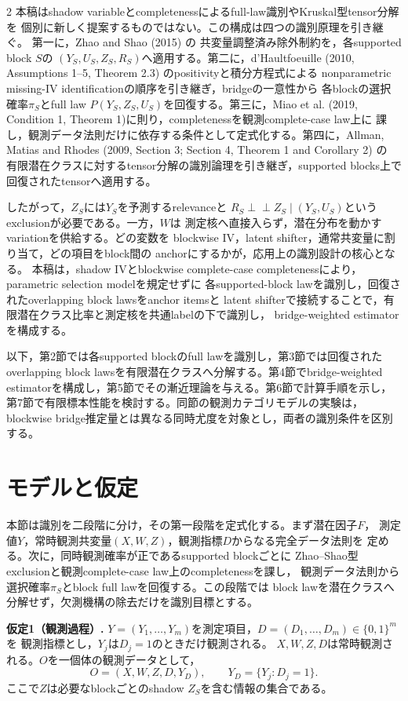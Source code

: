 \documentclass[a4paper,10pt]{article}
\newcommand{\indep}{\mathrel{\perp\!\!\!\perp}}
\begin{document}
\begin{multicols}{2}
本稿はshadow variableとcompletenessによるfull-law識別やKruskal型tensor分解を
個別に新しく提案するものではない。この構成は四つの識別原理を引き継ぐ。
第一に，Zhao and Shao (2015) の
共変量調整済み除外制約を，各supported block $S$の
$(Y_S,U_S,Z_S,R_S)$へ適用する。第二に，d'Haultfoeuille
(2010, Assumptions 1--5, Theorem 2.3) のpositivityと積分方程式による
nonparametric missing-IV identificationの順序を引き継ぎ，bridgeの一意性から
各blockの選択確率$\pi_S$とfull law $P(Y_S,Z_S,U_S)$を回復する。第三に，Miao et al.
(2019, Condition 1, Theorem 1)に則り，completenessを観測complete-case law上に
課し，観測データ法則だけに依存する条件として定式化する。第四に，Allman,
Matias and Rhodes (2009, Section 3; Section 4, Theorem 1 and Corollary 2) の
有限潜在クラスに対するtensor分解の識別論理を引き継ぎ，supported blocks上で
回復されたtensorへ適用する。

したがって，$Z_S$には$Y_S$を予測するrelevanceと
$R_S\indep Z_S\mid(Y_S,U_S)$というexclusionが必要である。一方，$W$は
測定核へ直接入らず，潜在分布を動かすvariationを供給する。どの変数を
blockwise IV，latent shifter，通常共変量に割り当て，どの項目をblock間の
anchorにするかが，応用上の識別設計の核心となる。
本稿は，shadow IVとblockwise complete-case completenessにより，parametric selection modelを規定せずに
各supported-block lawを識別し，回復されたoverlapping block lawsをanchor itemsと
latent shifterで接続することで，有限潜在クラス比率と測定核を共通labelの下で識別し，
bridge-weighted estimatorを構成する。

以下，第2節では各supported blockのfull lawを識別し，第3節では回復された
overlapping block lawsを有限潜在クラスへ分解する。第4節でbridge-weighted
estimatorを構成し，第5節でその漸近理論を与える。第6節で計算手順を示し，
第7節で有限標本性能を検討する。同節の観測カテゴリモデルの実験は，
blockwise bridge推定量とは異なる同時尤度を対象とし，両者の識別条件を区別する。

\section{モデルと仮定}
本節は識別を二段階に分け，その第一段階を定式化する。まず潜在因子$F$，
測定値$Y$，常時観測共変量$(X,W,Z)$，観測指標$D$からなる完全データ法則を
定める。次に，同時観測確率が正であるsupported blockごとに
Zhao--Shao型exclusionと観測complete-case law上のcompletenessを課し，
観測データ法則から選択確率$\pi_S$とblock full lawを回復する。この段階では
block lawを潜在クラスへ分解せず，欠測機構の除去だけを識別目標とする。

\noindent\textbf{仮定1（観測過程）.}
$Y=(Y_1,\ldots,Y_m)$を測定項目，$D=(D_1,\ldots,D_m)\in\{0,1\}^m$を
観測指標とし，$Y_j$は$D_j=1$のときだけ観測される。
$X,W,Z,D$は常時観測される。$O$を一個体の観測データとして，
\begin{equation}
O=(X,W,Z,D,Y_D),\qquad Y_D=\{Y_j:D_j=1\}.
\label{eq:observed-data}
\end{equation}
ここで$Z$は必要なblockごとのshadow $Z_S$を含む情報の集合である。


\end{multicols}
\end{document}
